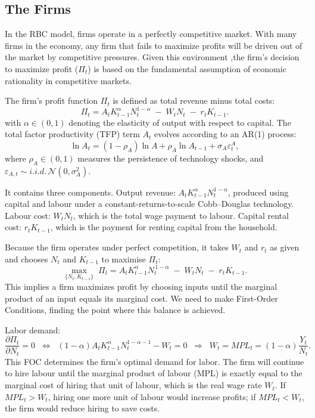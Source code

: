 \documentclass[12pt]{article}
\begin{document}
\subsection{The Firms}
In the RBC model, firms operate in a perfectly competitive market. With many firms in the economy, any firm that fails to maximize profits will be driven out of the market by competitive pressures. Given this environment ,the firm’s decision to maximize profit ($\Pi_t$) is based on the fundamental assumption of economic rationality in competitive markets.

The firm's profit function $\Pi_t$ is defined as total revenue minus total costs:
\[
\Pi_t = A_t K_{t-1}^{\alpha} N_t^{1-\alpha} \;-\; W_t N_t \;-\; r_t K_{t-1}.
\tag{13}
\]
with $\alpha \in (0,1)$ denoting the elasticity of output with respect to capital. 
The total factor productivity (TFP) term $A_t$ evolves according to an AR(1) process:
\[
\ln A_t = (1-\rho_A)\ln A + \rho_A \ln A_{t-1} + \sigma_A \varepsilon_t^A,
\tag{6}
\]
where $\rho_A \in (0,1)$ measures the persistence of technology shocks, and 
$\varepsilon_{A,t} \sim i.i.d.\,\mathcal{N}(0,\sigma_A^2)$.

It contains three components. Output revenue: $A_t K_{t-1}^{\alpha} N_t^{1-\alpha}$, produced using capital and labour under a constant-returns-to-scale Cobb--Douglas technology. Labour cost: $W_t N_t$, which is the total wage payment to labour. Capital rental cost: $r_t K_{t-1}$, which is the payment for renting capital from the household.

Because the firm operates under perfect competition, it takes $W_t$ and $r_t$ as given and chooses $N_t$ and $K_{t-1}$ to maximise $\Pi_t$:
\[
\max_{\{N_t, K_{t-1}\}} \; \Pi_t 
= A_t K_{t-1}^{\alpha} N_t^{\,1-\alpha} \;-\; W_t N_t \;-\; r_t K_{t-1}.
\]
This implies a firm maximizes profit by choosing inputs until the marginal product of an input equals its marginal cost. We need to make First-Order Conditions, finding the point where this balance is achieved.

Labor demand:
\[
\frac{\partial \Pi_t}{\partial N_t} = 0 
\;\;\Longleftrightarrow\;\;
(1-\alpha) A_t K_{t-1}^{\alpha} N_t^{1-\alpha-1} - W_t = 0
\;\;\Longrightarrow\;\;
W_t = MPL_t=(1-\alpha)\frac{Y_t}{N_t}.
\tag{14}
\]
This FOC determines the firm's optimal demand for labor.
The firm will continue to hire labour until the marginal product of labour (MPL) is exactly equal to the marginal cost of hiring that unit of labour, which is the real wage rate $W_t$. If $MPL_t > W_t$, hiring one more unit of labour would increase profits; if $MPL_t < W_t$, the firm would reduce hiring to save costs.
\end{document}
